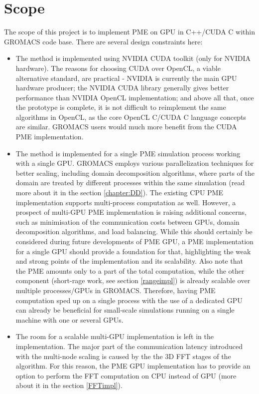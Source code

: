 \documentclass[12pt,a4paper]{report}
\newcommand{\draft}[1]{#1}
\begin{document}
\section{Scope} \label{chapter_scope}

The scope of this project is to implement PME on GPU in C++/CUDA C within GROMACS code base.
There are several design constraints here:
\begin{itemize}
\item The method is implemented using NVIDIA CUDA toolkit (only for NVIDIA hardware). The reasons for choosing CUDA over OpenCL, a viable alternative standard, are practical - NVIDIA is currently the main GPU hardware producer; the NVIDIA CUDA library generally gives better performance than NVIDIA OpenCL implementation; and above all that, once the prototype is complete, it is not difficult to reimplement the same algorithms in OpenCL, as the core OpenCL C/CUDA C language concepts are similar. GROMACS users would much more benefit from the CUDA PME implementation.
\item The method is implemented for a single PME simulation process working with a single GPU. GROMACS employs various parallelization techniques for better scaling, including domain decomposition algorithms, where parts of the domain are treated by different processes within the same simulation (read more about it in the section \ref{chapter:DD}). The existing CPU PME implementation supports multi-process computation as well. 
However, a prospect of multi-GPU PME implementation is raising additional concerns, such as minimisation of the communication costs between GPUs, domain decomposition algorithms, and load balancing. While this should certainly be considered during future developments of PME GPU, a PME implementation for a single GPU should provide a foundation for that, highlighting the weak and strong points of the implementation and its scalability. 
\draft{Also note that the PME amounts only to a part of the total computation, while the other component (short-rage work, see section \ref{rangeimpl}) is already scalable over multiple processes/GPUs in GROMACS. Therefore, having PME computation sped up on a single process with the use of a dedicated GPU can already be beneficial for small-scale simulations running on a single machine with one or several GPUs.
}
\item The room for a scalable multi-GPU implementation is left in the implementation. The major part of the communication latency introduced with the multi-node scaling is caused by the the 3D FFT stages of the algorithm. For this reason, the PME GPU implementation has to provide an option to perform the FFT computation on CPU instead of GPU (more about it in the section \ref{FFTimpl}).



\end{itemize}
\iffalse
\end{document}
